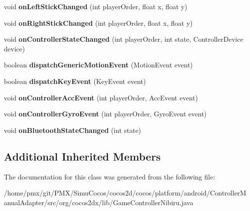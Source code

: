 \begin{DoxyCompactItemize}
\item 
\mbox{\label{classorg_1_1cocos2dx_1_1lib_1_1GameControllerNibiru_a21f353b12e1492cf46d25b55e2813999}} 
void {\bfseries on\+Left\+Stick\+Changed} (int player\+Order, float x, float y)
\item 
\mbox{\label{classorg_1_1cocos2dx_1_1lib_1_1GameControllerNibiru_acb15cbb77dfbc91fbf1d8f841bef8e97}} 
void {\bfseries on\+Right\+Stick\+Changed} (int player\+Order, float x, float y)
\item 
\mbox{\label{classorg_1_1cocos2dx_1_1lib_1_1GameControllerNibiru_ad42d7517715b4d0006f8a0ae65a354ea}} 
void {\bfseries on\+Controller\+State\+Changed} (int player\+Order, int state, Controller\+Device device)
\item 
\mbox{\label{classorg_1_1cocos2dx_1_1lib_1_1GameControllerNibiru_a01c649189fb04000d656c61e4348c9e3}} 
boolean {\bfseries dispatch\+Generic\+Motion\+Event} (Motion\+Event event)
\item 
\mbox{\label{classorg_1_1cocos2dx_1_1lib_1_1GameControllerNibiru_a8b61f0cd40311ac2d6fd8fccd71f651a}} 
boolean {\bfseries dispatch\+Key\+Event} (Key\+Event event)
\item 
\mbox{\label{classorg_1_1cocos2dx_1_1lib_1_1GameControllerNibiru_a0bad0f6ae551b89c3f4a3c803f9eef4c}} 
void {\bfseries on\+Controller\+Acc\+Event} (int player\+Order, Acc\+Event event)
\item 
\mbox{\label{classorg_1_1cocos2dx_1_1lib_1_1GameControllerNibiru_a20a633162329429973aedaadc38c2fdb}} 
void {\bfseries on\+Controller\+Gyro\+Event} (int player\+Order, Gyro\+Event event)
\item 
\mbox{\label{classorg_1_1cocos2dx_1_1lib_1_1GameControllerNibiru_ad889cbc56a5d66162d9d19a7339f6869}} 
void {\bfseries on\+Bluetooth\+State\+Changed} (int state)
\end{DoxyCompactItemize}
\subsection*{Additional Inherited Members}


The documentation for this class was generated from the following file\+:\begin{DoxyCompactItemize}
\item 
/home/pmx/git/\+P\+M\+X/\+Simu\+Cocos/cocos2d/cocos/platform/android/\+Controller\+Manual\+Adapter/src/org/cocos2dx/lib/Game\+Controller\+Nibiru.\+java\end{DoxyCompactItemize}
